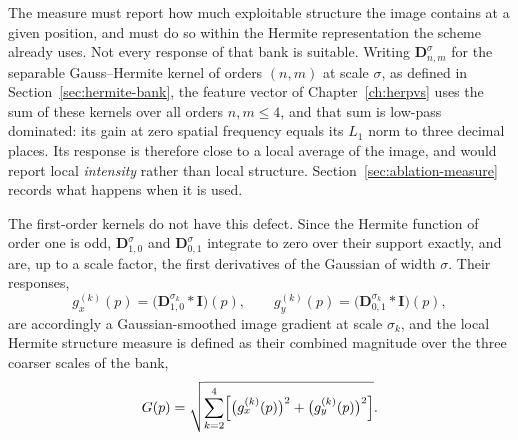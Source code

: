 The measure must report how much exploitable structure the image contains at
a given position, and must do so within the Hermite representation the scheme
already uses. Not every response of that bank is suitable. Writing
$\mathbf{D}_{n,m}^{\sigma}$ for the separable Gauss--Hermite kernel of orders
$(n,m)$ at scale $\sigma$, as defined in Section~\ref{sec:hermite-bank}, the
feature vector of Chapter~\ref{ch:herpvs} uses the sum of these kernels over
all orders $n,m\le4$, and that sum is low-pass dominated: its gain at zero
spatial frequency equals its $L_{1}$ norm to three decimal places. Its
response is therefore close to a local average of the image, and would report
local \emph{intensity} rather than local structure.
Section~\ref{sec:ablation-measure} records what happens when it is used.

The first-order kernels do not have this defect. Since the Hermite function
of order one is odd, $\mathbf{D}_{1,0}^{\sigma}$ and
$\mathbf{D}_{0,1}^{\sigma}$ integrate to zero over their support exactly, and
are, up to a scale factor, the first derivatives of the Gaussian of width
$\sigma$. Their responses,
\begin{equation}
    g_{x}^{(k)}(p)=\bigl(\mathbf{D}_{1,0}^{\sigma_{k}}\ast\mathbf{I}\bigr)(p),
    \qquad
    g_{y}^{(k)}(p)=\bigl(\mathbf{D}_{0,1}^{\sigma_{k}}\ast\mathbf{I}\bigr)(p),
    \label{eq:first-order-responses}
\end{equation}
are accordingly a Gaussian-smoothed image gradient at scale $\sigma_{k}$, and
the local Hermite structure measure is defined as their combined magnitude
over the three coarser scales of the bank,
\begin{equation}
    G(p)=\sqrt{\sum_{k=2}^{4}\Bigl[\bigl(g_{x}^{(k)}(p)\bigr)^{2}
                                  +\bigl(g_{y}^{(k)}(p)\bigr)^{2}\Bigr]}.
    \label{eq:structG}
\end{equation}

